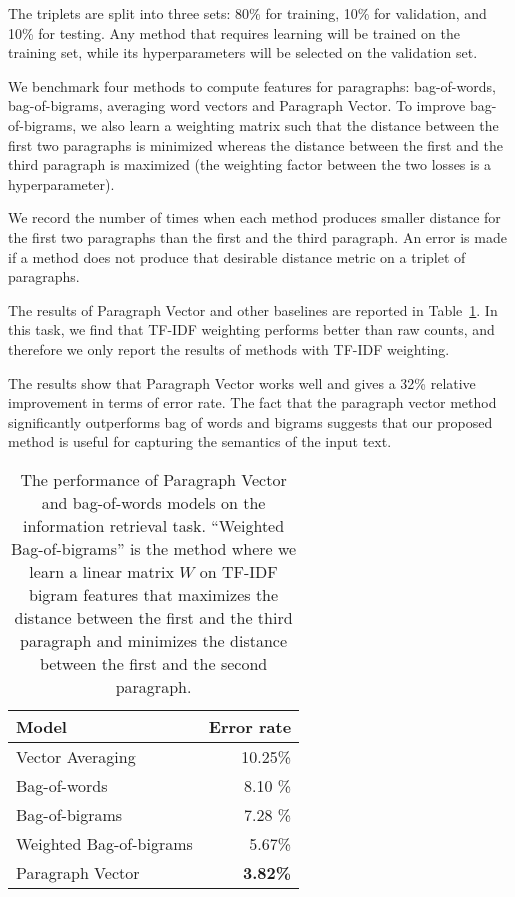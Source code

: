 \documentclass{article}
\begin{document}
The triplets are split into three sets: 80\% for training, 10\% for
validation, and 10\% for testing. Any method that requires learning
will be trained on the training set, while its hyperparameters will be
selected on the validation set.

We benchmark four methods to compute features for paragraphs:
bag-of-words, bag-of-bigrams, averaging word vectors and Paragraph
Vector. To improve bag-of-bigrams, we also learn a weighting matrix
such that the distance between the first two paragraphs is minimized
whereas the distance between the first and the third paragraph is
maximized (the weighting factor between the two losses is a
hyperparameter).

We record the number of times when each method produces smaller
distance for the first two paragraphs than the first and the third
paragraph. An error is made if a method does not produce that desirable
distance metric on a triplet of paragraphs.

The results of Paragraph Vector and other baselines are reported in
Table~\ref{tab:info}. In this task, we find that TF-IDF weighting
performs better than raw counts, and therefore we only report the
results of methods with TF-IDF weighting.

The results show that Paragraph Vector works well and gives a 32\%
relative improvement in terms of error rate. The fact that the
paragraph vector method significantly outperforms bag of words and
bigrams suggests that our proposed method is useful for capturing the
semantics of the input text.

\begin{table}[htb]
\caption{The performance of Paragraph Vector and bag-of-words models on the
  information retrieval task. ``Weighted Bag-of-bigrams'' is the
  method where we learn a linear matrix $W$ on TF-IDF bigram features
  that maximizes the distance between the first and the third paragraph
  and minimizes the distance between the first and the second
  paragraph.}
\label{tab:info}
\begin{center}
\begin{tabular}{|l|r|} 
\hline
Model & Error rate \\ \hline
Vector Averaging & 10.25\% \\
Bag-of-words & 8.10 \% \\ 
Bag-of-bigrams & 7.28 \% \\
Weighted Bag-of-bigrams & 5.67\% \\ 
Paragraph Vector & {\bf 3.82\%} \\
\hline
\end {tabular}
\end {center}
\end {table}
\end{document}
